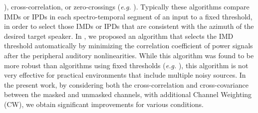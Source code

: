 \documentclass{article}
\newcommand{\eg}{\emph{e.g.} }
\begin{document}
\cite{C_Kim_INTERSPEECH_2009_1}), cross-correlation, or zero-crossings (\emph{e.g.} \cite{H_Park_SpeechComm_2009}).  Typically these algorithms compare IMDs or IPDs in each spectro-temporal segment of an input  to a fixed threshold, in order to select those IMDs or IPDs that are   consistent with the azimuth of the desired target speaker.  In \cite{C_Kim_INTERSPEECH_2010_1}, we proposed an algorithm that selects the     IMD threshold automatically by minimizing the correlation coefficient of power signals after the peripheral auditory nonlinearities. While this algorithm was found to be more robust than algorithms using fixed thresholds (\eg \cite{C_Kim_INTERSPEECH_2009_1}),   this algorithm is not very effective for practical environments that include   multiple noisy sources. In the present work, by considering both the cross-correlation and
cross-covariance between the masked and unmasked channels, with additional
Channel Weighting (CW), we obtain significant improvements for various conditions.
%
%
%
%
\end{document}
